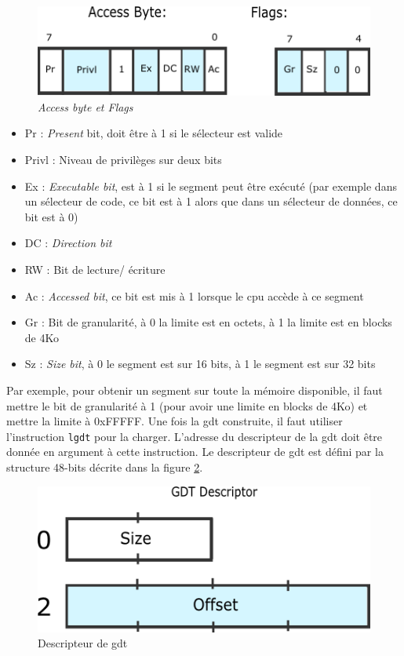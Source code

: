 \documentclass[a4paper]{article}
\begin{document}
\begin{figure}[!h]
  \centering
  \includegraphics[scale=0.75]{images/gdt_bits.png}
  \caption{\textit{Access byte et Flags}}
  \label{gdt_bits}
\end{figure}

\begin{itemize}[label=\textbullet]
	\item Pr : \textit{Present} bit, doit être à 1 si le sélecteur est valide
	\item Privl : Niveau de privilèges sur deux bits
	\item Ex : \textit{Executable bit}, est à 1 si le segment peut être exécuté
    (par exemple dans un sélecteur de code, ce bit est à 1 alors que dans un sélecteur
    de données, ce bit est à 0)
    \item DC : \textit{Direction bit}
    \item RW : Bit de lecture/ écriture
    \item Ac : \textit{Accessed bit}, ce bit est mis à 1 lorsque le \acrshort{cpu}
    accède à ce segment
    \item Gr : Bit de granularité, à 0 la limite est en octets, à 1 la limite est en blocks
    de 4Ko
    \item Sz : \textit{Size bit}, à 0 le segment est sur 16 bits, à 1 le segment
    est sur 32 bits
\end{itemize}

Par exemple, pour obtenir un segment sur toute la mémoire disponible, il faut mettre
le bit de granularité à 1 (pour avoir une limite en blocks de 4Ko) et mettre la
limite à 0xFFFFF. Une fois la \acrshort{gdt} construite, il faut utiliser l'instruction
\texttt{lgdt} pour la charger. L'adresse du descripteur de la \acrshort{gdt}
doit être donnée en argument à cette instruction. Le descripteur de \acrshort{gdt}
est défini par la structure 48-bits décrite dans la figure \ref{gdt_descriptor}.

\begin{figure}[!h]
  \centering
  \includegraphics[scale=0.5]{images/gdt_descriptor.png}
  \caption{Descripteur de \acrshort{gdt}}
  \label{gdt_descriptor}
\end{figure}
\end{document}
